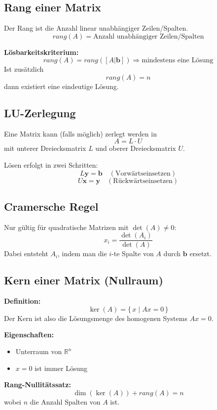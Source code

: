 \documentclass[10pt,a4paper,twocolumn]{article}
\newcommand{\seccol}{black}
\newcommand{\setseccol}[1]{\renewcommand{\seccol}{#1}}
\begin{document}
	\subsection{Rang einer Matrix}
	Der Rang ist die Anzahl linear unabhängiger Zeilen/Spalten.
	\[
	rang(A)=\text{Anzahl unabhängiger Zeilen/Spalten}
	\]
	
	\textbf{Lösbarkeitskriterium:}
	\[
	rang(A)=rang([A|\mathbf{b}]) \Rightarrow \text{mindestens eine Lösung}
	\]
	Ist zusätzlich
	\[
	rang(A)=n
	\]
	dann existiert eine eindeutige Lösung.
	
	\subsection{LU-Zerlegung}
	Eine Matrix kann (falls möglich) zerlegt werden in
	\[
	A = L\cdot U
	\]
	mit unterer Dreiecksmatrix $L$ und oberer Dreiecksmatrix $U$.
	
	Lösen erfolgt in zwei Schritten:
	\[
	L\mathbf{y}=\mathbf{b} \quad (\text{Vorwärtseinsetzen})
	\]
	\[
	U\mathbf{x}=\mathbf{y} \quad (\text{Rückwärtseinsetzen})
	\]
	
	\subsection{Cramersche Regel}
	Nur gültig für quadratische Matrizen mit $\det(A)\neq 0$:
	\[
	x_i=\frac{\det(A_i)}{\det(A)}
	\]
	Dabei entsteht $A_i$, indem man die $i$-te Spalte von $A$ durch $\mathbf{b}$ ersetzt.
	
	\subsection{Kern einer Matrix (Nullraum)}
	\textbf{Definition:}
	\[
	\ker(A)=\{\,x \mid Ax=0\,\}
	\]
	Der Kern ist also die Lösungsmenge des homogenen Systems $Ax=0$.
	
	\textbf{Eigenschaften:}
	\begin{itemize}
		\item Unterraum von $\mathbb{R}^n$
		\item $x=0$ ist immer Lösung
	\end{itemize}
	
	\textbf{Rang-Nullitätssatz:}
	\[
	\dim(\ker(A)) + rang(A) = n
	\]
	wobei $n$ die Anzahl Spalten von $A$ ist.
	
	\setseccol{c6}
\end{document}

